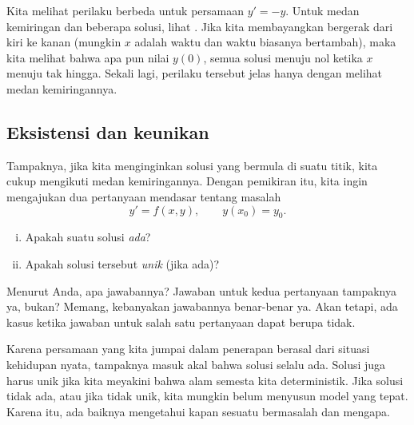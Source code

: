 Kita melihat perilaku berbeda untuk persamaan
$y' = -y$.  Untuk medan kemiringan dan beberapa solusi,
lihat .
Jika kita membayangkan bergerak dari kiri ke kanan (mungkin $x$ adalah waktu
dan waktu biasanya bertambah), maka
kita melihat bahwa apa pun nilai $y(0)$, semua solusi menuju nol ketika $x$
menuju tak hingga.
Sekali lagi, perilaku tersebut jelas hanya dengan
melihat medan kemiringannya.

\begin{myfig}
\capstart
{}
\caption{Medan kemiringan $y' = -y$ dengan grafik beberapa solusi.\label{1.3:fig3}}
\end{myfig}

\subsection{Eksistensi dan keunikan}

Tampaknya, jika kita menginginkan solusi yang bermula di suatu titik,
kita cukup mengikuti medan kemiringannya.
Dengan pemikiran itu,
kita ingin mengajukan dua pertanyaan mendasar tentang masalah
\begin{equation*}
y' = f(x,y), \qquad y(x_0) = y_0.
\end{equation*}
\begin{enumerate}[(i)]
\item Apakah suatu solusi \emph{ada}?
\item Apakah solusi tersebut \emph{unik} (jika ada)?
\end{enumerate}

Menurut Anda, apa jawabannya?
Jawaban untuk kedua pertanyaan tampaknya ya, bukan?
Memang, kebanyakan jawabannya benar-benar ya.  Akan tetapi, ada
kasus ketika jawaban untuk salah satu pertanyaan dapat berupa tidak.

Karena persamaan yang kita jumpai dalam penerapan
berasal dari situasi kehidupan nyata, tampaknya
masuk akal bahwa solusi selalu ada.
Solusi juga harus unik jika kita meyakini bahwa
alam semesta kita deterministik.  Jika solusi tidak ada, atau jika
tidak unik, kita
mungkin belum menyusun model yang tepat.  Karena itu, ada baiknya mengetahui
kapan sesuatu bermasalah dan mengapa.


